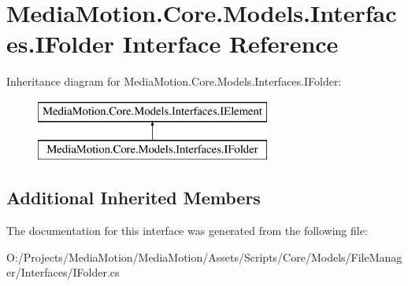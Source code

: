 \hypertarget{interface_media_motion_1_1_core_1_1_models_1_1_interfaces_1_1_i_folder}{\section{Media\+Motion.\+Core.\+Models.\+Interfaces.\+I\+Folder Interface Reference}
\label{interface_media_motion_1_1_core_1_1_models_1_1_interfaces_1_1_i_folder}
}
Inheritance diagram for Media\+Motion.\+Core.\+Models.\+Interfaces.\+I\+Folder\+:\begin{figure}[H]
\begin{center}
\leavevmode
\includegraphics[height=2.000000cm]{interface_media_motion_1_1_core_1_1_models_1_1_interfaces_1_1_i_folder}
\end{center}
\end{figure}
\subsection*{Additional Inherited Members}


The documentation for this interface was generated from the following file\+:\begin{DoxyCompactItemize}
\item 
O\+:/\+Projects/\+Media\+Motion/\+Media\+Motion/\+Assets/\+Scripts/\+Core/\+Models/\+File\+Manager/\+Interfaces/I\+Folder.\+cs\end{DoxyCompactItemize}
